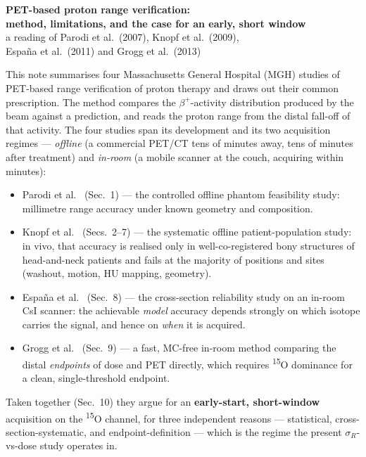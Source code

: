 \documentclass[11pt]{article}
\newcommand{\iso}[2]{\textsuperscript{#1}#2}
\begin{document}
\begin{center}
  {\large\textbf{PET-based proton range verification:}}\\[2pt]
  {\large\textbf{method, limitations, and the case for an early, short window}}\\[4pt]
  {\normalsize a reading of Parodi et al.\ (2007), Knopf et al.\ (2009),}\\[1pt]
  {\normalsize Espa\~na et al.\ (2011) and Grogg et al.\ (2013)}
\end{center}
\medskip

\noindent
This note summarises four Massachusetts General Hospital (MGH) studies of
PET-based range verification of proton therapy and draws out their common
prescription. The method compares the $\beta^+$-activity distribution produced
by the beam against a prediction, and reads the proton range from the distal
fall-off of that activity. The four studies span its development and its two
acquisition regimes --- \emph{offline} (a commercial PET/CT tens of minutes
away, tens of minutes after treatment) and \emph{in-room} (a mobile scanner at
the couch, acquiring within minutes):
\begin{itemize}
\item Parodi et al.~\cite{parodi2007a} (Sec.~1) --- the controlled offline
  phantom feasibility study: millimetre range accuracy under known geometry and
  composition.
\item Knopf et al.~\cite{knopf2009} (Secs.~2--7) --- the systematic offline
  patient-population study: in vivo, that accuracy is realised only in
  well-co-registered bony structures of head-and-neck patients and fails at the
  majority of positions and sites (washout, motion, HU mapping, geometry).
\item Espa\~na et al.~\cite{espana2011} (Sec.~8) --- the cross-section
  reliability study on an in-room CsI scanner: the achievable \emph{model}
  accuracy depends strongly on which isotope carries the signal, and hence on
  \emph{when} it is acquired.
\item Grogg et al.~\cite{grogg2013} (Sec.~9) --- a fast, MC-free in-room method
  comparing the distal \emph{endpoints} of dose and PET directly, which requires
  \iso{15}{O} dominance for a clean, single-threshold endpoint.
\end{itemize}
Taken together (Sec.~10) they argue for an \textbf{early-start, short-window}
acquisition on the \iso{15}{O} channel, for three independent reasons ---
statistical, cross-section-systematic, and endpoint-definition --- which is the
regime the present $\sigma_R$-vs-dose study operates in.
\end{document}
